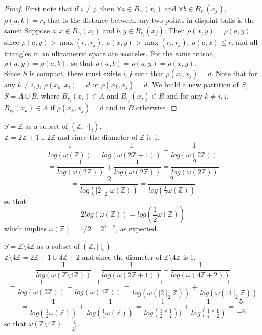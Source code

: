 \begin{proof}
First note that if $i \neq j$, then $\forall a \in B_{r_i}(x_i)$ and $\forall b \in B_{r_j}(x_j)$, $\rho(a,b) = r$, that is the distance between any two points in disjoint balls is the same:  Suppose $a,x \in B_{r_i}(x_i)$ and  $b,y \in B_{r_j}(x_j)$. Then $\rho(x,y)=\rho(a,y)$ since $\rho(a,y) > \max(r_i,r_j)$, $\rho(x,y) > \max(r_i,r_j)$, $\rho(a,x) \leq r_i$ and all triangles in an ultrametric space are isosceles. For the same reason, $\rho(a,y) = \rho(a,b)$, so that $\rho(a,b)=\rho(a,y)=\rho(x,y)$.\\
\noindent Since $S$ is compact, there must exists $i,j$ such that $\rho(x_i, x_j)=d$. Note that for any $k \neq i,j$, $\rho(x_k,x_i) = d$ or $\rho(x_k, x_j)=d$. We build a new partition of $S$, $S=A \cup B$, where $B_{r_i}(x_i) \in A$ and $B_{r_j}(x_j) \in B$ and for any $k \neq i,j$, $B_{r_k}(x_k) \in A$ if $\rho(x_k,x_j) = d$ and in $B$ otherwise. 
\end{proof}

\begin{example}
	{$S=\mathbb{Z}$ as a subset of $(\mathbb{Z},|\cdot|_2)$}.\\
	$\mathbb{Z} = 2 \mathbb{Z} +1 \cup 2 \mathbb{Z}$ and since the diameter of $\mathbb{Z}$ is 1, 
	\[\frac{1}{log(\omega(\mathbb{Z}))} = \frac{1}{log(\omega(2\mathbb{Z}+1))} + \frac{1}{log(\omega(2\mathbb{Z}))}\]
	\[= \frac{1}{log(\omega(2\mathbb{Z}))} + \frac{1}{log(\omega(2\mathbb{Z}))} = \frac{2}{log(\omega(2\mathbb{Z}))}\]
	\[=\frac{2}{log(\mid 2 \mid_2\omega(\mathbb{Z}))} =\frac{2}{log(\frac{1}{2}\omega(\mathbb{Z}))}\] so that 
	\[2log(\omega(\mathbb{Z})) = log(\frac{1}{2}\omega(\mathbb{Z}))\]
	which implies $\omega(\mathbb{Z}) = 1/2 = 2^{1-2}$, as expected.
	
\end{example}

\begin{example}
	{$S=\mathbb{Z} \setminus 4\mathbb{Z}$ as a subset of $(\mathbb{Z},|\cdot|_2)$}\\
	$\mathbb{Z} \setminus 4\mathbb{Z} = 2\mathbb{Z} + 1 \cup 4\mathbb{Z} +2$ 
and since the diameter of $\mathbb{Z} \setminus 4\mathbb{Z}$ is 1,	
\[\frac{1}{log(\omega(\mathbb{Z} \setminus 4\mathbb{Z}))} = \frac{1}{log(\omega(2\mathbb{Z}+1))} + \frac{1}{log(\omega(4\mathbb{Z}+2))}\]
\[=\frac{1}{log(\omega(2\mathbb{Z}))} + \frac{1}{log(\omega(4\mathbb{Z}))} =\frac{1}{log(\omega(\mid 2 \mid_2\mathbb{Z}))} + \frac{1}{log(\omega(\mid 4 \mid_2\mathbb{Z}))}\]
\[=\frac{1}{log(\frac{1}{2}\omega(\mathbb{Z}))} + \frac{1}{log(\frac{1}{4}\omega(\mathbb{Z}))} =\frac{1}{log(\frac{1}{2}*\frac{1}{2}))} + \frac{1}{log(\frac{1}{4}*\frac{1}{2})}=\frac{5}{-6}\]
so that $\omega(\mathbb{Z} \setminus 4\mathbb{Z}) = \frac{1}{2^{\frac{6}{5}}}$.
\end{example}

